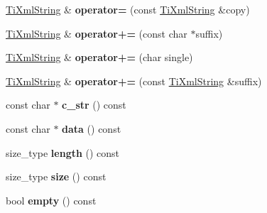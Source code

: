 \begin{DoxyCompactItemize}
\item 
\hypertarget{class_ti_xml_string_ab1f1f5d3eceaa0f22d0a7e6055ea81b0}{\hyperlink{class_ti_xml_string}{Ti\+Xml\+String} \& {\bfseries operator=} (const \hyperlink{class_ti_xml_string}{Ti\+Xml\+String} \&copy)}\label{class_ti_xml_string_ab1f1f5d3eceaa0f22d0a7e6055ea81b0}

\item 
\hypertarget{class_ti_xml_string_ab56336ac2aa2a08d24a71eb9a2b502a5}{\hyperlink{class_ti_xml_string}{Ti\+Xml\+String} \& {\bfseries operator+=} (const char $\ast$suffix)}\label{class_ti_xml_string_ab56336ac2aa2a08d24a71eb9a2b502a5}

\item 
\hypertarget{class_ti_xml_string_a6aa09d5240470b76d54ec709e04f8c13}{\hyperlink{class_ti_xml_string}{Ti\+Xml\+String} \& {\bfseries operator+=} (char single)}\label{class_ti_xml_string_a6aa09d5240470b76d54ec709e04f8c13}

\item 
\hypertarget{class_ti_xml_string_afdcae5ea2b4d9e194dc21226b817f417}{\hyperlink{class_ti_xml_string}{Ti\+Xml\+String} \& {\bfseries operator+=} (const \hyperlink{class_ti_xml_string}{Ti\+Xml\+String} \&suffix)}\label{class_ti_xml_string_afdcae5ea2b4d9e194dc21226b817f417}

\item 
\hypertarget{class_ti_xml_string_a5581ca641d915551d3cda90f8e7bf49b}{const char $\ast$ {\bfseries c\+\_\+str} () const }\label{class_ti_xml_string_a5581ca641d915551d3cda90f8e7bf49b}

\item 
\hypertarget{class_ti_xml_string_a00abc60f135c7ca1951c7334cc2c7993}{const char $\ast$ {\bfseries data} () const }\label{class_ti_xml_string_a00abc60f135c7ca1951c7334cc2c7993}

\item 
\hypertarget{class_ti_xml_string_a3202f27d139a3fac79205f1f3c707727}{size\+\_\+type {\bfseries length} () const }\label{class_ti_xml_string_a3202f27d139a3fac79205f1f3c707727}

\item 
\hypertarget{class_ti_xml_string_a96103e5c0f67e987fa48527e1f47a1f6}{size\+\_\+type {\bfseries size} () const }\label{class_ti_xml_string_a96103e5c0f67e987fa48527e1f47a1f6}

\item 
\hypertarget{class_ti_xml_string_a9a61e1d11cdb71bea4a4ed79caa793f4}{bool {\bfseries empty} () const }\label{class_ti_xml_string_a9a61e1d11cdb71bea4a4ed79caa793f4}


\end{DoxyCompactItemize}
